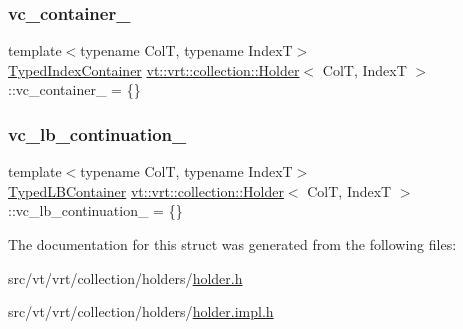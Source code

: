 \subsubsection{\texorpdfstring{vc\+\_\+container\+\_\+}{vc\_container\_}}
{\footnotesize\ttfamily template$<$typename ColT, typename IndexT$>$ \\
\hyperlink{structvt_1_1vrt_1_1collection_1_1_holder_ae8d4ff940c971d52b237cf4d6049380a}{Typed\+Index\+Container} \hyperlink{structvt_1_1vrt_1_1collection_1_1_holder}{vt\+::vrt\+::collection\+::\+Holder}$<$ ColT, IndexT $>$\+::vc\+\_\+container\+\_\+ = \{\}\hspace{0.3cm}{\ttfamily [private]}}

\mbox{\label{structvt_1_1vrt_1_1collection_1_1_holder_a510efbbf387e9c93e90a29d4db231aa4}} 
\subsubsection{\texorpdfstring{vc\+\_\+lb\+\_\+continuation\+\_\+}{vc\_lb\_continuation\_}}
{\footnotesize\ttfamily template$<$typename ColT, typename IndexT$>$ \\
\hyperlink{structvt_1_1vrt_1_1collection_1_1_holder_a9738cadcf89ace9c3d0c23990e4f919e}{Typed\+L\+B\+Container} \hyperlink{structvt_1_1vrt_1_1collection_1_1_holder}{vt\+::vrt\+::collection\+::\+Holder}$<$ ColT, IndexT $>$\+::vc\+\_\+lb\+\_\+continuation\+\_\+ = \{\}\hspace{0.3cm}{\ttfamily [private]}}



The documentation for this struct was generated from the following files\+:\begin{DoxyCompactItemize}
\item 
src/vt/vrt/collection/holders/\hyperlink{vrt_2collection_2holders_2holder_8h}{holder.\+h}\item 
src/vt/vrt/collection/holders/\hyperlink{vrt_2collection_2holders_2holder_8impl_8h}{holder.\+impl.\+h}\end{DoxyCompactItemize}

